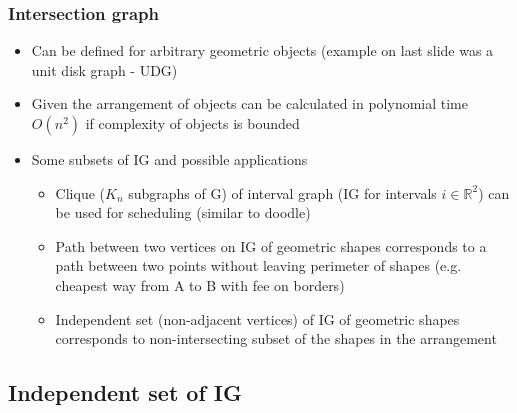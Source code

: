 \documentclass{beamer}
\begin{document}
\begin{frame}
\frametitle{Intersection graph}
\begin{itemize}
\item Can be defined for arbitrary geometric objects (example on last slide was a unit disk graph - UDG)
\item Given the arrangement of objects can be calculated in polynomial time $O(n^2)$ if complexity of objects is bounded
\item<2-> Some subsets of IG and possible applications
\begin{itemize}
\item<2-> Clique ($K_n$ subgraphs of G) of interval graph (IG for intervals $ i \in \mathbb R^2$) can be used for scheduling (similar to doodle)
\item<3-> Path between two vertices on IG of geometric shapes corresponds to a path between two points without leaving perimeter of shapes (e.g. cheapest way from A to B with fee on borders)
\item<4-> Independent set (non-adjacent vertices) of IG of geometric shapes corresponds to non-intersecting subset of the shapes in the arrangement
\end{itemize}
\end{itemize}
\end{frame}




\subsection{Independent set of IG}
\end{document}

